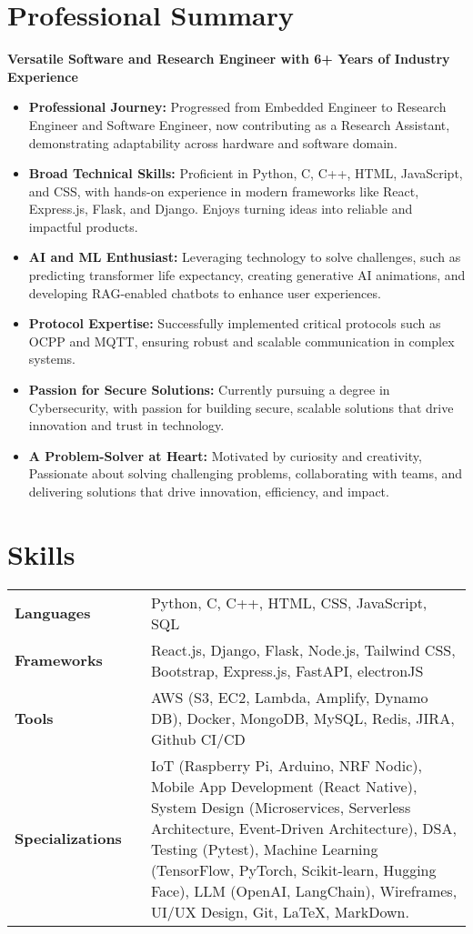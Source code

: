 \documentclass[a4paper,10pt]{article}
\newenvironment{zitemize}{
  \begin{itemize} 
    \itemsep 0pt 
    \parskip 0pt 
    \parsep 1pt
    \topsep 0pt 
    \partopsep 0pt
    \sloppy
}{
  \end{itemize}
  \vspace{0.5em} %
}
\newcommand{\skills}[1]{ {\bfseries #1}} %
\begin{document}
\section*{Professional Summary}
\textbf{Versatile Software and Research Engineer with 6+ Years of Industry Experience}
\begin{zitemize}
    \item \textbf{Professional Journey:} Progressed from Embedded Engineer to Research Engineer and Software Engineer, now contributing as a Research Assistant, demonstrating adaptability across hardware and software domain.
    \item \textbf{Broad Technical Skills:} Proficient in Python, C, C++, HTML, JavaScript, and CSS, with hands-on experience in modern frameworks like React, Express.js, Flask, and Django. Enjoys turning ideas into reliable and impactful products.
    \item \textbf{AI and ML Enthusiast:} Leveraging technology to solve challenges, such as predicting transformer life expectancy, creating generative AI animations, and developing RAG-enabled chatbots to enhance user experiences.
    \item \textbf{Protocol Expertise:} Successfully implemented critical protocols such as OCPP and MQTT, ensuring robust and scalable communication in complex systems.
    \item \textbf{Passion for Secure Solutions:} Currently pursuing a degree in Cybersecurity, with passion for building secure, scalable solutions that drive innovation and trust in technology.
    \item \textbf{A Problem-Solver at Heart:} Motivated by curiosity and creativity, Passionate about solving challenging problems, collaborating with teams, and delivering solutions that drive innovation, efficiency, and impact.
\end{zitemize}

\section*{Skills}
\begin{tabular}{p{10em} p{2em} p{40em}}
    \skills{Languages}       &  & Python, C, C++, HTML, CSS, JavaScript, SQL                                                   \\
    \skills{Frameworks}      &  & React.js, Django, Flask, Node.js, Tailwind CSS, Bootstrap, Express.js, FastAPI, electronJS   \\
    \skills{Tools}           &  & AWS (S3, EC2, Lambda, Amplify, Dynamo DB), Docker, MongoDB, MySQL, Redis, JIRA, Github CI/CD \\
    \skills{Specializations} &  & IoT (Raspberry Pi, Arduino, NRF Nodic), Mobile App Development (React Native), System Design
    (Microservices, Serverless Architecture, Event-Driven Architecture), DSA, Testing (Pytest),
    Machine Learning (TensorFlow, PyTorch, Scikit-learn, Hugging Face), LLM (OpenAI, LangChain), Wireframes, UI/UX Design, Git, \LaTeX, MarkDown.
\end{tabular}
\end{document}
